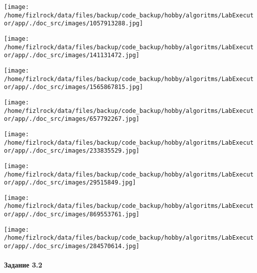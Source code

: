 \documentclass[a4paper, 12pt]{article}
\begin{document}
\texttt{[image: /home/fizlrock/data/files/backup/code\_backup/hobby/algoritms/LabExecutor/app/./doc\_src/images/1057913288.jpg]}

\texttt{[image: /home/fizlrock/data/files/backup/code\_backup/hobby/algoritms/LabExecutor/app/./doc\_src/images/141131472.jpg]}

\texttt{[image: /home/fizlrock/data/files/backup/code\_backup/hobby/algoritms/LabExecutor/app/./doc\_src/images/1565867815.jpg]}

\texttt{[image: /home/fizlrock/data/files/backup/code\_backup/hobby/algoritms/LabExecutor/app/./doc\_src/images/657792267.jpg]}

\texttt{[image: /home/fizlrock/data/files/backup/code\_backup/hobby/algoritms/LabExecutor/app/./doc\_src/images/233835529.jpg]}

\texttt{[image: /home/fizlrock/data/files/backup/code\_backup/hobby/algoritms/LabExecutor/app/./doc\_src/images/29515849.jpg]}

\texttt{[image: /home/fizlrock/data/files/backup/code\_backup/hobby/algoritms/LabExecutor/app/./doc\_src/images/869553761.jpg]}

\texttt{[image: /home/fizlrock/data/files/backup/code\_backup/hobby/algoritms/LabExecutor/app/./doc\_src/images/284570614.jpg]}
\pagebreak

\paragraph{Задание 3.2}
\end{document}
